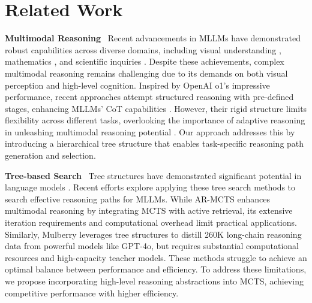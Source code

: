 \section{Related Work}
\label{sec2}
\textbf{Multimodal Reasoning}
$\,$ Recent advancements in MLLMs have demonstrated robust capabilities across diverse domains, including visual understanding \cite{10445007}, mathematics \cite{zhang2024mavis,du2025virgo}, and scientific inquiries \cite{zong-qiu-2024-gaokao}. Despite these achievements, complex multimodal reasoning remains challenging due to its demands on both visual perception and high-level cognition. Inspired by OpenAI o1's impressive performance, recent approaches \cite{zhang2024improve,xu2024llava,thawakar2025llamav} attempt structured reasoning with pre-defined stages, enhancing MLLMs' CoT capabilities \cite{zhang2024multimodal}. However, their rigid structure limits flexibility across different tasks, overlooking the importance of adaptive reasoning in unleashing multimodal reasoning potential \cite{wang2024enhancing}. Our approach addresses this by introducing a hierarchical tree structure that enables task-specific reasoning path generation and selection.

\vskip 0.0827in
\textbf{Tree-based Search}
$\,$ Tree structures have demonstrated significant potential in language models \cite{zhang2024accessing,qi2024mutual,wu2024beyond}. Recent efforts explore applying these tree search methods to search effective reasoning paths for MLLMs. While AR-MCTS \cite{dong2024progressive} enhances multimodal reasoning by integrating MCTS with active retrieval, its extensive iteration requirements and computational overhead limit practical applications. Similarly, Mulberry \cite{yao2024mulberry} leverages tree structures to distill 260K long-chain reasoning data from powerful models like GPT-4o, but requires substantial computational resources and high-capacity teacher models. These methods struggle to achieve an optimal balance between performance and efficiency. To address these limitations, we propose incorporating high-level reasoning abstractions into MCTS, achieving competitive performance with higher efficiency.